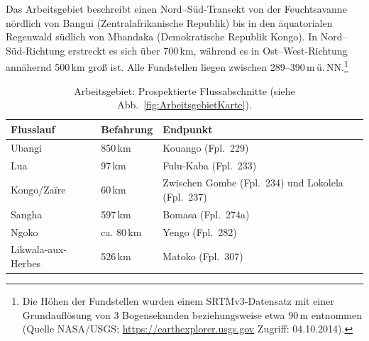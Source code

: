 Das Arbeitsgebiet beschreibt einen Nord–Süd-Transekt von der Feuchtsavanne nördlich von Bangui (Zentralafrikanische Republik) bis in den äquatorialen Regenwald südlich von Mba\-ndaka (Demokratische Republik Kongo). In Nord--Süd-Richtung erstreckt es sich über 700\,km, während es in Ost--West-Richtung annähernd 500\,km groß ist. Alle Fundstellen liegen zwischen 289--390\,m\,ü.\,NN.\footnote{Die Höhen der Fundstellen wurden einem SRTMv3-Datensatz mit einer Grundauflösung von 3 Bogensekunden beziehungsweise etwa 90\,m entnommen (Quelle NASA/USGS; \url{https://earthexplorer.usgs.gov} Zugriff: 04.10.2014).}

\begin{table}[t]
\centering
{\small \begin{tabular}{@{}p{}R{.11\textwidth}p{.5\textwidth}@{}}
\toprule
\textbf{Flusslauf} & \textbf{Befahrung} & \textbf{Endpunkt} \\
\midrule
Ubangi & 850\,km & Kouango (Fpl.~229) \\
Lua & 97\,km & Fulu-Kaba (Fpl.~233) \\
Kongo/Za{\"i}re & 60\,km & Zwischen Gombe (Fpl.~234) und Lokolela (Fpl.~237) \\
Sangha & 597\,km & Bomasa (Fpl.~274a) \\
Ngoko & ca. 80\,km & Yengo (Fpl.~282)\\
Likwala-aux-Herbes & 526\,km & Matoko (Fpl.~307) \\
\bottomrule
\end{tabular}}
\caption{Arbeitsgebiet: Prospektierte Flussabschnitte (siehe Abb.~\ref{fig:ArbeitsgebietKarte}).}
\label{tab:ArbeitsgebietFlussstrecken}
\end{table}

